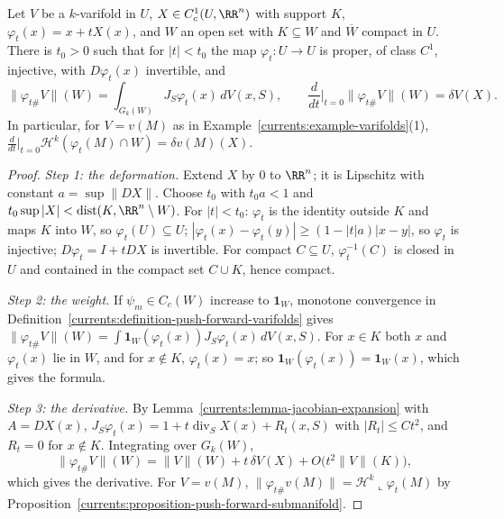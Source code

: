 \begin{proposition}\label{currents:proposition-first-variation-area}
Let $V$ be a $k$-varifold in $U$, $X \in C^1_c(U, \RR^n)$ with support $K$, $\varphi_t(x) = x + tX(x)$, and $W$ an open set with $K \subseteq W$ and $\overline{W}$ compact in $U$. There is $t_0 > 0$ such that for
$|t| < t_0$ the map $\varphi_t \colon U \to U$ is proper, of class $C^1$, injective, with $D\varphi_t(x)$ invertible, and
\[
\|\varphi_{t\#}V\|(W) = \int_{G_k(W)}J_S\varphi_t(x)\,dV(x, S), \qquad \frac{d}{dt}\Big|_{t=0}\|\varphi_{t\#}V\|(W) = \delta V(X) .
\]
In particular, for $V = v(M)$ as in Example~\ref{currents:example-varifolds}(1), $\frac{d}{dt}\big|_{t=0}\mathcal{H}^k(\varphi_t(M) \cap W) = \delta v(M)(X)$.
\end{proposition}

\begin{proof}
\emph{Step 1: the deformation.} Extend $X$ by $0$ to $\RR^n$; it is Lipschitz with constant $a = \sup\|DX\|$. Choose $t_0$ with $t_0a < 1$ and $t_0\sup|X| < \operatorname{dist}(K, \RR^n \setminus W)$. For
$|t| < t_0$: $\varphi_t$ is the identity outside $K$ and maps $K$ into $W$, so $\varphi_t(U) \subseteq U$; $|\varphi_t(x) - \varphi_t(y)| \geq (1 - |t|a)|x - y|$, so $\varphi_t$ is injective;
$D\varphi_t = I + tDX$ is invertible. For compact $C \subseteq U$, $\varphi_t^{-1}(C)$ is closed in $U$ and contained in the compact set $C \cup K$, hence compact.

\emph{Step 2: the weight.} If $\psi_m \in C_c(W)$ increase to $\mathbf{1}_W$, monotone convergence in Definition~\ref{currents:definition-push-forward-varifolds} gives
$\|\varphi_{t\#}V\|(W) = \int\mathbf{1}_W(\varphi_t(x))J_S\varphi_t(x)\,dV(x, S)$. For $x \in K$ both $x$ and $\varphi_t(x)$ lie in $W$, and for $x \notin K$, $\varphi_t(x) = x$; so
$\mathbf{1}_W(\varphi_t(x)) = \mathbf{1}_W(x)$, which gives the formula.

\emph{Step 3: the derivative.} By Lemma~\ref{currents:lemma-jacobian-expansion} with $A = DX(x)$, $J_S\varphi_t(x) = 1 + t\operatorname{div}_SX(x) + R_t(x, S)$ with $|R_t| \leq Ct^2$, and $R_t = 0$ for
$x \notin K$. Integrating over $G_k(W)$,
\[
\|\varphi_{t\#}V\|(W) = \|V\|(W) + t\,\delta V(X) + O\bigl(t^2\|V\|(K)\bigr),
\]
which gives the derivative. For $V = v(M)$, $\|\varphi_{t\#}v(M)\| = \mathcal{H}^k\llcorner\varphi_t(M)$ by Proposition~\ref{currents:proposition-push-forward-submanifold}.
\end{proof}

